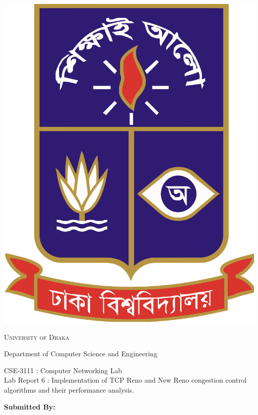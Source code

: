\documentclass[11pt]{article}
\begin{document}
\begin{titlepage}
    \begin{center}
        \includegraphics[scale=0.10]{du.png}\par
        \begin{Huge}
            \textsc{University of Dhaka}\par
        \end{Huge}
        \begin{Large}
            Department of Computer Science and Engineering\par \vspace{1cm}
            CSE-3111 : Computer Networking Lab \\[12pt]   
            Lab Report 6 : Implementation of TCP Reno and New Reno congestion control algorithms and their
performance analysis.
        \end{Large}
    \end{center}     
    \begin{large}
        \textbf{Submitted By:\\[12pt]}

\end{large}
\end{titlepage}
\end{document}
